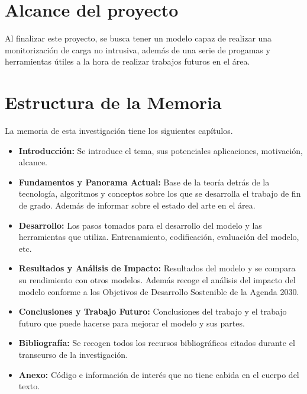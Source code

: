 \section{Alcance del proyecto}
\label{sec:alcanceproyecto}
Al finalizar este proyecto, se busca tener un modelo capaz de realizar una monitorización de carga no intrusiva, además de una serie de progamas y herramientas útiles a la hora de realizar trabajos futuros en el área.

\section{Estructura de la Memoria}
\label{sec:estructuramemoria}
La memoria de esta investigación tiene los siguientes capítulos.
\begin{itemize}
	\item \textbf{Introducción: } Se introduce el tema, sus potenciales aplicaciones, motivación, alcance. 
	\item \textbf{Fundamentos y Panorama Actual: } Base de la teoría detrás de la tecnología, algoritmos y conceptos sobre los que se desarrolla el trabajo de fin de grado. Además de informar sobre el estado del arte en el área.
	\item \textbf{Desarrollo: } Los pasos tomados para el desarrollo del modelo y las herramientas que utiliza. Entrenamiento, codificación, evaluación del modelo, etc. 
	\item \textbf{Resultados y Análisis de Impacto: } Resultados del modelo y se compara su rendimiento con otros modelos. Además recoge el análisis del impacto del modelo conforme a los Objetivos de Desarrollo Sostenible de la Agenda 2030.
	\item \textbf{Conclusiones y Trabajo Futuro: } Conclusiones del trabajo y el trabajo futuro que puede hacerse para mejorar el modelo y sus partes. 
	\item \textbf{Bibliografía: } Se recogen todos los recursos bibliográficos citados durante el transcurso de la investigación.
	\item \textbf{Anexo: } Código e información de interés que no tiene cabida en el cuerpo del texto. 
\end{itemize}



